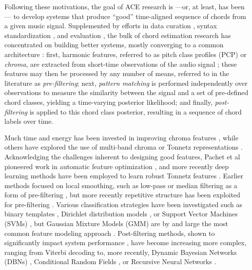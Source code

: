 \documentclass{article}
\begin{document}
Following these motivations, the goal of ACE research is ---or, at least, has been--- to develop systems that produce ``good'' time-aligned sequence of chords from a given music signal.
Supplemented by efforts in data curation \cite{Burgoyne2011Billboard}, syntax standardization \cite{Harte2005XXX}, and evaluation \cite{Pauwels2013Evaluating}, the bulk of chord estimation research has concentrated on building better systems, mostly converging to a common architecture \cite{Cho2014Improved}:
first, harmonic features, referred to as pitch class profiles (PCP) or \emph{chroma}, are extracted from short-time observations of the audio signal \cite{Fujishima1999Realtime};
these features may then be processed by any number of means, referred to in the literature as \emph{pre-filtering};
next, \emph{pattern matching} is performed independently over observations to measure the similarity between the signal and a set of pre-defined chord classes, yielding a time-varying posterior likelihood;
and finally, \emph{post-filtering} is applied to this chord class posterior, resulting in a sequence of chord labels over time.


Much time and energy has been invested in improving chroma features \cite{Mueller2010Towards}, while others have explored the use of multi-band chroma \cite{Mauch2010Simultaneous} or Tonnetz representations \cite{Lee2007Unified}.
Acknowledging the challenges inherent to designing good features, Pachet et al pioneered work in automatic feature optimization \cite{Pachet2006Recognizing}, and more recently deep learning methods have been employed to learn robust Tonnetz features \cite{Humphrey2012Learning}.
Earlier methods focused on local smoothing, such as low-pass or median filtering as a form of pre-filtering \cite{Cho2010Exploring}, but more recently repetitive structure has been exploited for pre-filtering \cite{Cho2011Feature}.
Various classification strategies have been investigated such as binary templates \cite{Oudre2009Template}, Dirichlet distribution models \cite{Burgoyne2005Learning}, or Support Vector Machines (SVMs) \cite{Weller2009Structured}, but Gaussian Mixture Models (GMM) are by and large the most common feature modeling approach \cite{Cho2014Improved}.
Post-filtering methods, shown to significantly impact system performance \cite{Cho2010Exploring}, have become increasing more complex, ranging from Viterbi decoding \cite{Sheh2003Chord} to, more recently, Dynamic Bayesian Networks (DBNs) \cite{Mauch2010Approximate}, Conditional Random Fields \cite{Sumi2012Music}, or Recursive Neural Networks \cite{Boulanger2013Automatic}.
\end{document}
